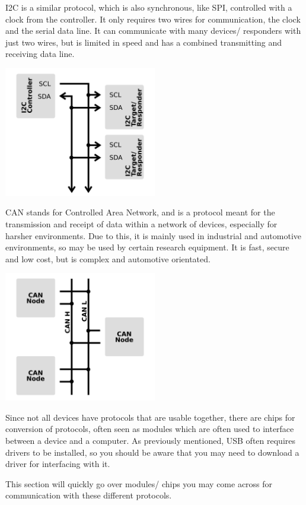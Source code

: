 \documentclass[a4paper,11pt]{report}
\begin{document}
I2C is a similar protocol, which is also synchronous, like SPI, controlled with a clock from the controller. It only requires two wires for communication, the clock and the serial data line. It can communicate with many devices/ responders with just two wires, but is limited in speed and has a combined transmitting and receiving data line.

\includegraphics[width=0.5\textwidth]{I2C}

CAN stands for Controlled Area Network, and is a protocol meant for the transmission and receipt of data within a network of devices, especially for harsher environments. Due to this, it is mainly used in industrial and automotive environments, so may be used by certain research equipment. It is fast, secure and low cost, but is complex and automotive orientated.

\includegraphics[width=0.5\textwidth]{CAN}

Since not all devices have protocols that are usable together, there are chips for conversion of protocols, often seen as modules which are often used to interface between a device and a computer. As previously mentioned, USB often requires drivers to be installed, so you should be aware that you may need to download a driver for interfacing with it.

This section will quickly go over modules/ chips you may come across for communication with these different protocols.
\end{document}
